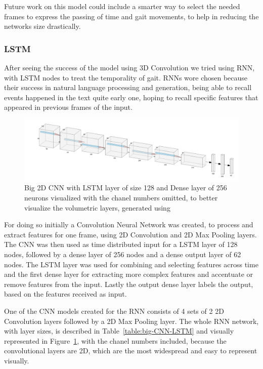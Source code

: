 \documentclass[12pt]{article}
\theoremstyle{definition}
\begin{document}
	Future work on this model could include a smarter way to select the needed frames to express the passing of time and gait movements, to help in reducing the networks size drastically.

	\subsubsection{LSTM}

	After seeing the success of the model using 3D Convolution we tried using RNN, with LSTM nodes to treat the temporality of gait. RNNs wore chosen because their success in natural language processing and generation, being able to recall events happened in the text quite early one, hoping to recall specific features that appeared in previous frames of the input.

	\begin{figure}[ht]
		\includegraphics[width=\textwidth]{networks/big-2D-CNN-LSTM-Dense.png}
		\caption{Big 2D CNN with LSTM layer of size 128 and Dense layer of 256 neurons visualized with the chanel numbers omitted, to better visualize the volumetric layers, generated using \cite{nn-svg}}
		\label{figure:big-2D-CNN-LSTM-Dense}
	\end{figure}

	For doing so initially a Convolution Neural Network was created, to process and extract features for one frame, using 2D Convolution and 2D Max Pooling layers. The CNN was then used as time distributed input for a LSTM layer of 128 nodes, followed by a dense layer of 256 nodes and a dense output layer of 62 nodes.
	The LSTM layer was used for combining and selecting features across time and the first dense layer for extracting more complex features and accentuate or remove features from the input. Lastly the output dense layer labels the output, based on the features received as input.

	One of the CNN models created for the RNN consists of 4 sets of 2 2D Convolution layers followed by a 2D Max Pooling layer. The whole RNN network, with layer sizes, is described in Table~\ref{table:big-CNN-LSTM} and visually represented in Figure~\ref{figure:big-2D-CNN-LSTM-Dense}, with the chanel numbers included, because the convolutional layers are 2D, which are the most widespread and easy to represent visually.
\end{document}
